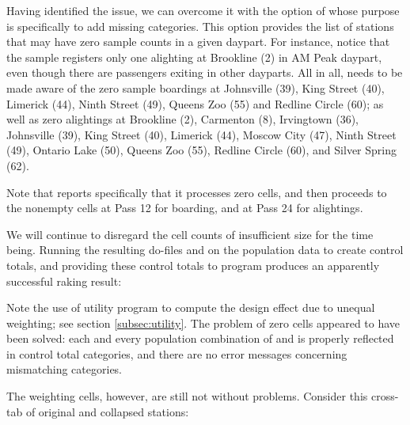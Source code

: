 Having identified the issue, we can overcome it with the  option
of  whose purpose is specifically to add missing categories.
This option provides the list of stations that may have zero sample counts
in a given daypart.
For instance, notice that the sample registers only one alighting at Brookline (2)
in AM Peak daypart, even though there are passengers exiting in other dayparts. All in all,
 needs to be made aware of the zero sample boardings at
Johnsville (39), King Street (40), Limerick (44), Ninth Street (49),
Queens Zoo (55) and Redline Circle (60); as well as zero alightings at Brookline (2),
Carmenton (8), Irvingtown (36),
Johnsville (39), King Street (40), Limerick (44), Moscow City (47), Ninth Street (49),
Ontario Lake (50), Queens Zoo (55), Redline Circle (60), and Silver Spring (62).

\cnp

\begin{stlog}
\nullskip
\end{stlog}

Note that  reports specifically that it processes zero cells,
and then proceeds to the nonempty cells at Pass 12 for boarding, and at Pass 24 for alightings.

We will continue to disregard the cell counts of insufficient size for the time being.
Running the resulting do-files  and 
on the population data to create control totals, and providing these control totals
to  program produces an apparently successful raking result:

\noindent
\begin{stlog}
\nullskip
\end{stlog}

Note the use of utility program  to compute the design effect
due to unequal weighting; see section \ref{subsec:utility}. The problem of zero cells
appeared to have been solved: each and every population combination of 
and  is properly reflected in control total categories, and there are
no error messages concerning mismatching categories.

The weighting cells, however, are still not without problems. Consider this
cross-tab of original and collapsed stations:

\begin{stlog}
\nullskip
\end{stlog}

